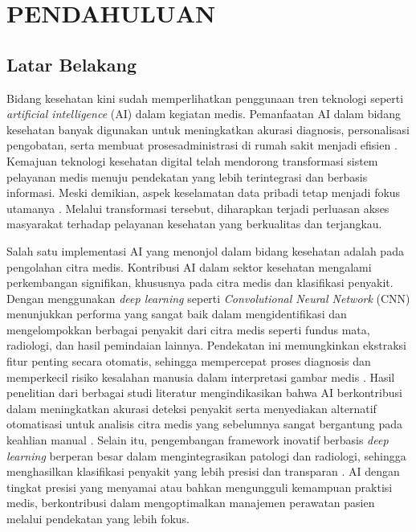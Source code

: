 \newpage
\chapter{PENDAHULUAN} \label{Bab I}

\section{Latar Belakang} \label{I.Latar Belakang}
Bidang kesehatan kini sudah memperlihatkan penggunaan tren teknologi
seperti \textit{artificial intelligence} (AI) dalam kegiatan
medis. Pemanfaatan AI dalam bidang kesehatan banyak digunakan untuk
meningkatkan akurasi diagnosis, personalisasi pengobatan, serta membuat 
prosesadministrasi di rumah sakit menjadi efisien \cite{info:doi/10.2196/53616}. 
Kemajuan teknologi kesehatan digital telah mendorong transformasi sistem 
pelayanan medis menuju pendekatan yang lebih terintegrasi dan berbasis 
informasi. Meski demikian, aspek keselamatan data pribadi tetap menjadi 
fokus utamanya \cite{lee2024status}. Melalui transformasi tersebut, 
diharapkan terjadi perluasan akses masyarakat terhadap pelayanan 
kesehatan yang berkualitas dan terjangkau. \par

Salah satu implementasi AI yang menonjol dalam bidang kesehatan adalah
pada pengolahan citra medis. Kontribusi AI dalam sektor kesehatan 
mengalami perkembangan signifikan, khususnya pada citra medis dan 
klasifikasi penyakit. Dengan menggunakan \textit{deep learning} seperti
\textit{Convolutional Neural Network} (CNN) menunjukkan performa yang 
sangat baik dalam mengidentifikasi dan mengelompokkan berbagai penyakit 
dari citra medis seperti fundus mata, radiologi, dan hasil pemindaian 
lainnya. Pendekatan ini memungkinkan ekstraksi fitur penting secara 
otomatis, sehingga mempercepat proses diagnosis dan memperkecil risiko 
kesalahan manusia dalam interpretasi gambar medis \cite{Nozomi_Aldi_Sentosa_2022}. 
Hasil penelitian dari berbagai studi literatur mengindikasikan bahwa AI 
berkontribusi dalam meningkatkan akurasi deteksi penyakit serta 
menyediakan alternatif otomatisasi untuk analisis citra medis yang 
sebelumnya sangat bergantung pada keahlian manual \cite{li2023medical}. 
Selain itu, pengembangan framework inovatif berbasis \textit{deep learning} 
berperan besar dalam mengintegrasikan patologi dan radiologi, sehingga 
menghasilkan klasifikasi penyakit yang lebih presisi dan transparan \cite{he2025deep}. 
AI dengan tingkat presisi yang menyamai atau bahkan mengungguli kemampuan
praktisi medis, berkontribusi dalam mengoptimalkan manajemen perawatan
pasien melalui pendekatan yang lebih fokus. \par

